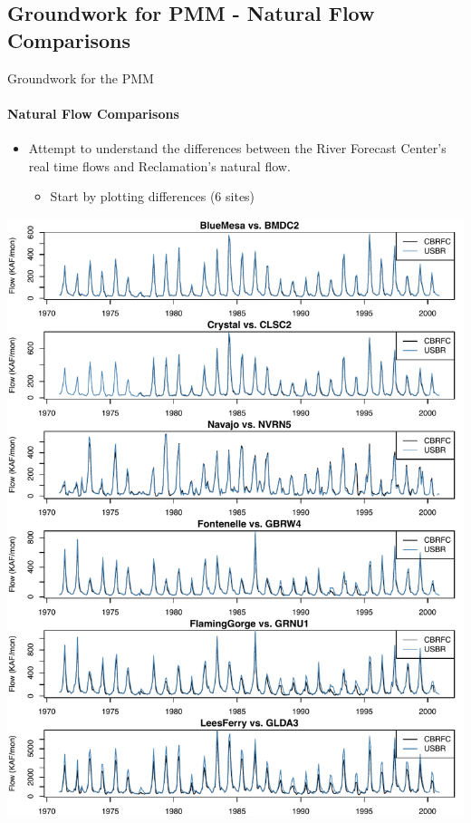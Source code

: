 \documentclass[compress]{beamer}
\begin{document}
\subsection{Groundwork for PMM - Natural Flow Comparisons}
\begin{frame}{Groundwork for the PMM}
\framesubtitle{Natural Flow Comparisons}
\begin{itemize}
\item Attempt to understand the differences between the River Forecast Center's real time flows and Reclamation's natural flow.
	\begin{itemize}
		\item Start by plotting differences (6 sites)
	\end{itemize}
\end{itemize}
\pause
\includegraphics[width=\textwidth]{figs/lees-data.pdf}\\
\pause

\end{frame}
\end{document}
